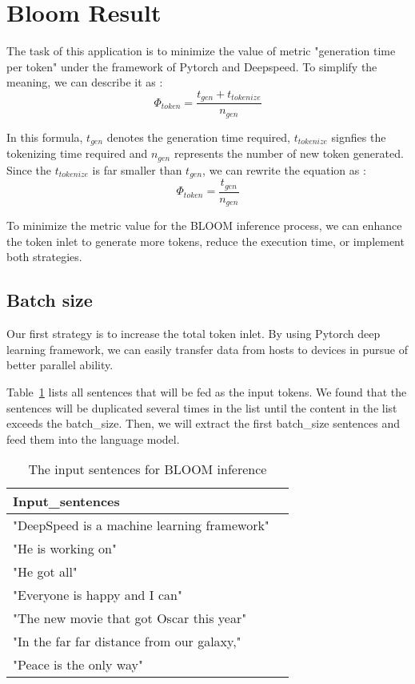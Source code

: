 \pgfplotsset{compat=1.17}

\section{Bloom Result}
\label{sec:BLOOM}
The task of this application is to minimize the value of metric "generation time per token" under the framework of Pytorch and Deepspeed. To simplify the meaning, we can describe it as : \\
\[\Phi_{token} = \frac{t_{gen} + t_{tokenize}}{n_{gen}}\]

In this formula, \(t_{gen}\) denotes the generation time required, \(t_{tokenize}\) signfies the tokenizing time required and \(n_{gen}\) represents the number of new token generated. Since the \(t_{tokenize}\) is far smaller than \(t_{gen}\), we can rewrite the equation as : \\
\[\Phi_{token} = \frac{t_{gen}}{n_{gen}}\]

To minimize the metric value for the BLOOM inference process, we can enhance the token inlet to generate more tokens, reduce the execution time, or implement both strategies.


\subsection{Batch size}
Our first strategy is to increase the total token inlet. By using Pytorch deep learning framework, we can easily transfer data from hosts to devices in pursue of better parallel ability.

Table~\ref{table:bloom-input} lists all sentences that will be fed as the input tokens. We found that the sentences will be duplicated several times in the list until the content in the list exceeds the batch\_size. Then, we will extract the first batch\_size sentences and feed them into the language model.

\begin{table}[t]
    \centering
    \caption{The input sentences for BLOOM inference}
    \label{table:bloom-input}
    \begin{tabular}{ll}
        \toprule
        Input\_sentences  \\
        \midrule
        "DeepSpeed is a machine learning framework" \\
        "He is working on" \\
        "He got all" \\
        "Everyone is happy and I can" \\
        "The new movie that got Oscar this year" \\
        "In the far far distance from our galaxy," \\
        "Peace is the only way" \\
        \bottomrule
    \end{tabular}
\end{table}

